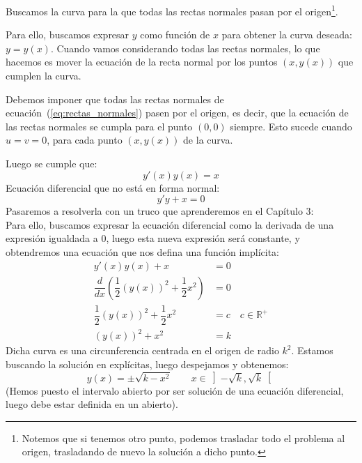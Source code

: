 \begin{ejemplo}
    Buscamos la curva para la que todas las rectas normales pasan por el origen\footnote{Notemos que si tenemos otro punto, podemos trasladar todo el problema al origen, trasladando de nuevo la solución a dicho punto.}.

    Para ello, buscamos expresar $y$ como función de $x$ para obtener la curva deseada: $y=y(x)$. Cuando vamos considerando todas las rectas normales, lo que hacemos es mover la ecuación de la recta normal por los puntos $(x,y(x))$ que cumplen la curva. 

    Debemos imponer que todas las rectas normales de ecuación~(\ref{eq:rectas_normales}) pasen por el origen, es decir, que la ecuación de las rectas normales se cumpla para el punto $(0,0)$ siempre. Esto sucede cuando $u=v=0$, para cada punto $(x,y(x))$ de la curva.

Luego se cumple que:
\begin{equation*}
    y'(x)y(x) = x
\end{equation*}
Ecuación diferencial que no está en forma normal:
\begin{equation*}
    y'y+x=0
\end{equation*}
Pasaremos a resolverla con un truco que aprenderemos en el Capítulo 3:\\

Para ello, buscamos expresar la ecuación diferencial como la derivada de una expresión igualdada a 0, luego esta nueva expresión será constante, y obtendremos una ecuación que nos defina una función implícita:
\begin{align*}
    y'(x)y(x) + x &= 0 \\
    \dfrac{d}{dx}\left(\dfrac{1}{2}{(y(x))}^{2}+\dfrac{1}{2}x^2\right)&= 0 \\
    \dfrac{1}{2}{\left(y(x)\right)}^{2}+\dfrac{1}{2}x^2&=c \quad c\in \mathbb{R}^+\\
    {\left(y(x)\right)}^{2}+x^2 &= k
\end{align*}
Dicha curva es una circunferencia centrada en el origen de radio $k^2$. Estamos buscando la solución en explícitas, luego despejamos y obtenemos:
\begin{equation*}
    y(x) = \pm \sqrt{k-x^2} \qquad x\in \left]-\sqrt{k},\sqrt{k}\right[
\end{equation*}
(Hemos puesto el intervalo abierto por ser solución de una ecuación diferencial, luego debe estar definida en un abierto).
\end{ejemplo}

